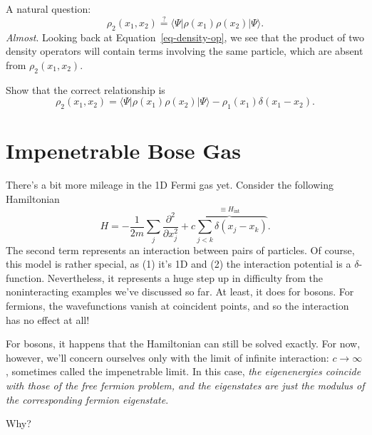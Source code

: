 \documentclass[
  a4paper,
]{scrbook}
\begin{document}
A natural question: \[
\rho_2(x_1,x_2) \overset{?}{=} \langle{\Psi}\rvert\rho(x_1)\rho(x_2)\lvert{\Psi}\rangle.
\] \emph{Almost}. Looking back at Equation~\ref{eq-density-op}, we see
that the product of two density operators will contain terms involving
the same particle, which are absent from \(\rho_2(x_1,x_2)\).

\begin{tcolorbox}[enhanced jigsaw, rightrule=.15mm, opacityback=0, bottomtitle=1mm, colbacktitle=quarto-callout-tip-color!10!white, colback=white, toprule=.15mm, titlerule=0mm, arc=.35mm, title=\textcolor{quarto-callout-tip-color}{\faLightbulb}\hspace{0.5em}{Check}, left=2mm, opacitybacktitle=0.6, breakable, leftrule=.75mm, bottomrule=.15mm, colframe=quarto-callout-tip-color-frame, toptitle=1mm, coltitle=black]

Show that the correct relationship is \[
\rho_2(x_1,x_2) = \langle{\Psi}\rvert\rho(x_1)\rho(x_2)\lvert{\Psi}\rangle - \rho_1(x_1)\delta(x_1-x_2).
\]

\end{tcolorbox}

\section{Impenetrable Bose Gas}\label{impenetrable-bose-gas}

There's a bit more mileage in the 1D Fermi gas yet. Consider the
following Hamiltonian \[
H = -\frac{1}{2m}\sum_j \frac{\partial^2}{\partial x_j^2} + \overbrace{c\sum_{j<k}\delta(x_j-x_k)}^{\equiv H_\text{int}}.
\label{many_LL}
\] The second term represents an interaction between pairs of particles.
Of course, this model is rather special, as (1) it's 1D and (2) the
interaction potential is a \(\delta\)-function. Nevertheless, it
represents a huge step up in difficulty from the noninteracting examples
we've discussed so far. At least, it does for bosons. For fermions, the
wavefunctions vanish at coincident points, and so the interaction has no
effect at all!

For bosons, it happens that the Hamiltonian can still be solved exactly.
For now, however, we'll concern ourselves only with the limit of
infinite interaction: \(c\to \infty\), sometimes called the impenetrable
limit. In this case, \emph{the eigenenergies coincide with those of the
free fermion problem, and the eigenstates are just the modulus of the
corresponding fermion eigenstate}.

\begin{tcolorbox}[enhanced jigsaw, rightrule=.15mm, opacityback=0, bottomtitle=1mm, colbacktitle=quarto-callout-tip-color!10!white, colback=white, toprule=.15mm, titlerule=0mm, arc=.35mm, title=\textcolor{quarto-callout-tip-color}{\faLightbulb}\hspace{0.5em}{Check}, left=2mm, opacitybacktitle=0.6, breakable, leftrule=.75mm, bottomrule=.15mm, colframe=quarto-callout-tip-color-frame, toptitle=1mm, coltitle=black]

Why?

\end{tcolorbox}
\end{document}
